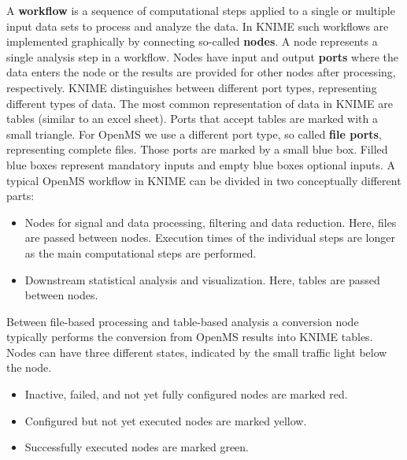 A \textbf{workflow} is a sequence of computational steps applied to a single or multiple input data sets to process and analyze the data.
In KNIME such workflows are implemented graphically by connecting so-called \textbf{nodes}.
A node represents a single analysis step in a workflow.
Nodes have input and output \textbf{ports} where the data enters the node or the results are provided for other nodes after processing, respectively.
KNIME distinguishes between different port types, representing different types of data.
The most common representation of data in KNIME are tables (similar to an excel sheet).
Ports that accept tables are marked with a small triangle.
For OpenMS we use a different port type, so called \textbf{file ports}, representing complete files.
Those ports are marked by a small blue box.
Filled blue boxes represent mandatory inputs and empty blue boxes optional inputs.
A typical OpenMS workflow in KNIME can be divided in two conceptually different parts:
\begin{itemize}
\item
Nodes for signal and data processing, filtering and data reduction. Here, files are passed between nodes. Execution times of the individual steps are longer as the main computational steps are performed. 
\item
Downstream statistical analysis and visualization. Here, tables are passed between nodes.
\end{itemize}
Between file-based processing and table-based analysis a conversion node typically performs the conversion from OpenMS results into KNIME tables.
Nodes can have three different states, indicated by the small traffic light below the node.

\begin{itemize}
\item
Inactive, failed, and not yet fully configured nodes are marked red.
\item
Configured but not yet executed nodes are marked yellow.
\item
Successfully executed nodes are marked green.
\end{itemize}

